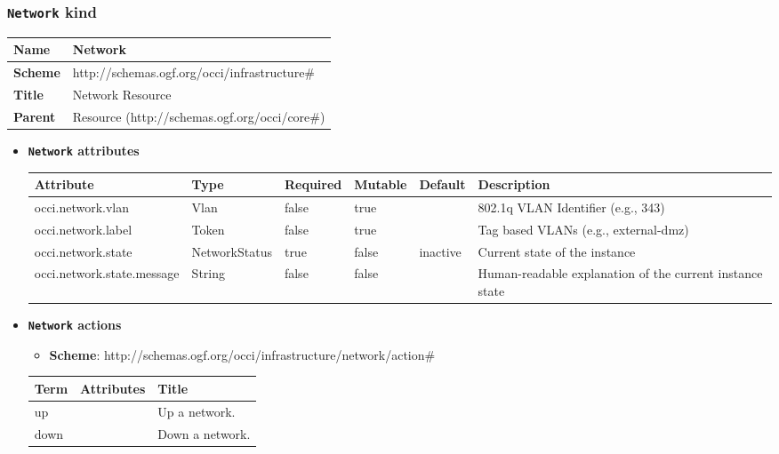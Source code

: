 \subsubsection{\texttt{Network} kind}
\begin{center}
\begin{tabular}{|l|l|}
  \hline
  \textbf{Name} & Network \\
  \hline  
  \textbf{Scheme} & http://schemas.ogf.org/occi/infrastructure\# \\
  \hline
  \textbf{Title} & Network Resource \\
  \hline
  \textbf{Parent} & Resource (http://schemas.ogf.org/occi/core\#) \\
  \hline
\end{tabular}
\end{center}
\begin{itemize}
\item \textbf{\texttt{Network} attributes}

\begin{tabularx}{\textwidth}{|l|l|p{1.4cm}|p{1.3cm}|l|X|}
  \hline
  \textbf{Attribute} & \textbf{Type} & \textbf{Required} & \textbf{Mutable} & \textbf{Default} & \textbf{Description} \\
  \hline  
  occi.network.vlan & Vlan & false & true &  & 802.1q VLAN Identifier (e.g., 343) \\
  \hline
  occi.network.label & Token & false & true &  & Tag based VLANs (e.g., external-dmz) \\
  \hline
  occi.network.state & NetworkStatus & true & false & inactive & Current state of the instance \\
  \hline
  occi.network.state.message & String & false & false &  & Human-readable explanation of the current instance state \\
  \hline
\end{tabularx}
\end{itemize}

\begin{itemize}
\item \textbf{\texttt{Network} actions}

\begin{itemize}
	\item \textbf{Scheme}: http://schemas.ogf.org/occi/infrastructure/network/action\#
\end{itemize}
\begin{tabularx}{\textwidth}{|l|l|X|}
  \hline
  \textbf{Term}  & \textbf{Attributes} & \textbf{Title} \\
  \hline  
  up & & Up a network. \\
  \hline
  down & & Down a network. \\
  \hline
\end{tabularx}
\end{itemize}

